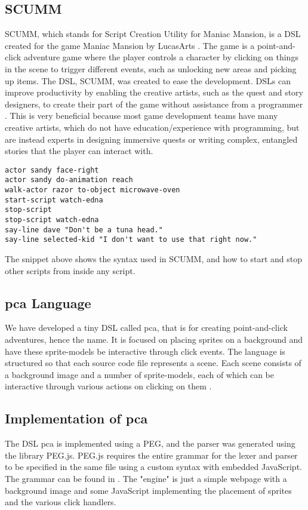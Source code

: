 \subsection{SCUMM}
SCUMM, which stands for Script Creation Utility for Maniac Mansion, is a \ac{DSL} created for the game Maniac Mansion by LucasArts \cite{gamasutra:scumm}. The game is a point-and-click adventure game where the player controls a character by clicking on things in the scene to trigger different events, such as unlocking new areas and picking up items. The \ac{DSL}, SCUMM, was created to ease the development. DSLs can improve productivity by enabling the creative artists, such as the quest and story designers, to create their part of the game without assistance from a programmer \cite{gamasutra:scumm}. This is very beneficial because most game development teams have many creative artists, which do not have education/experience with programming, but are instead experts in designing immersive quests or writing complex, entangled stories that the player can interact with. 

\begin{lstlisting}
actor sandy face-right
actor sandy do-animation reach
walk-actor razor to-object microwave-oven
start-script watch-edna
stop-script
stop-script watch-edna
say-line dave "Don't be a tuna head."
say-line selected-kid "I don't want to use that right now."
\end{lstlisting}
The snippet above shows the syntax used in SCUMM, and how to start and stop other scripts from inside any script.

\subsection{pca Language} \label{sec:animools}
We have developed a tiny \ac{DSL} called pca, that is for creating point-and-click adventures, hence the name. It is focused on placing sprites on a background and have these sprite-models be interactive through click events. The language is structured so that each source code file represents a scene.
Each scene consists of a background image and a number of sprite-models, each of which can be interactive through various actions on clicking on them \cite{github:pca}. 

\subsection{Implementation of pca}
The \ac{DSL} pca is implemented using a \ac{PEG}, and the parser was generated using the library PEG.js. PEG.js requires the entire grammar for the lexer and parser to be specified in the same file using a custom syntax with embedded JavaScript. The grammar can be found in . The "engine" is just a simple webpage with a background image and some JavaScript implementing the placement of sprites and the various click handlers.

